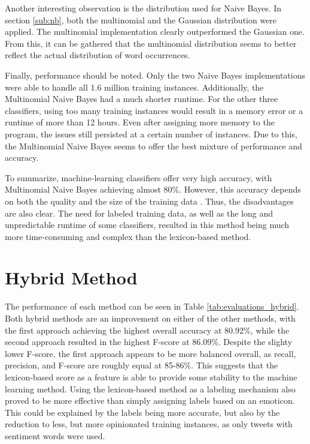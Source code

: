 Another interesting observation is the distribution used for Naive Bayes. In section \ref{sub:nb}, both the multinomial and the Gaussian distribution were applied. The multinomial implementation clearly outperformed the Gaussian one. From this, it can be gathered that the multinomial distribution seems to better reflect the actual distribution of word occurrences.

Finally, performance should be noted. Only the two Naive Bayes implementations were able to handle all 1.6 million training instances. Additionally, the Multinomial Naive Bayes had a much shorter runtime. For the other three classifiers, using too many training instances would result in a memory error or a runtime of more than 12 hours. Even after assigning more memory to the program, the issues still persisted at a certain number of instances. Due to this, the Multinomial Naive Bayes seems to offer the best mixture of performance and accuracy.

To summarize, machine-learning classifiers offer very high accuracy, with Multinomial Naive Bayes achieving almost 80\%. However, this accuracy depends on both the quality and the size of the training data \cite{DBLP:journals/csur/GiachanouC16}. Thus, the disadvantages are also clear. The need for labeled training data, as well as the long and unpredictable runtime of some classifiers, resulted in this method being much more time-consuming and complex than the lexicon-based method. 

\section{Hybrid Method}

The performance of each method can be seen in Table \ref{tab:evaluations_hybrid}. Both hybrid methods are an improvement on either of the other methods, with the first approach achieving the highest overall accuracy at 80.92\%, while the second approach resulted in the highest F-score at 86.09\%. Despite the slighty lower F-score, the first approach appears to be more balanced overall, as recall, precision, and F-score are roughly equal at 85-86\%. This suggests that the lexicon-based score as a feature is able to provide some stability to the machine learning method. Using the lexicon-based method as a labeling mechanism also proved to be more effective than simply assigning labels based on an emoticon. This could be explained by the labels being more accurate, but also by the reduction to less, but more opinionated training instances, as only tweets with sentiment words were used.

